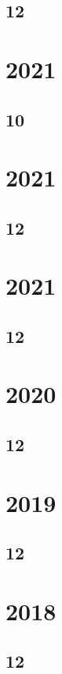 \documentclass[11pt]{book}
\begin{document}
\subsection{12}

\section{2021}
\subsection{10}

\section{2021}
\subsection{12}

\section{2021}
\subsection{12}

\section{2020}
\subsection{12}

\section{2019}
\subsection{12}





\section{2018}
\subsection{12}



\end{document}
